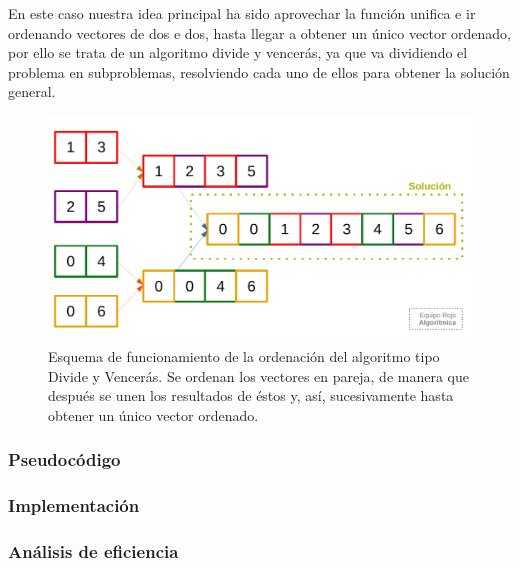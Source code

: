 En este caso nuestra idea principal ha sido aprovechar la función unifica e ir ordenando vectores de dos e dos,
hasta llegar a obtener un único vector ordenado, por ello se trata de un algoritmo divide y vencerás, ya que va dividiendo 
el problema en subproblemas, resolviendo cada uno de ellos para obtener la solución general. 

\begin{figure}[H]
	\centering
    \includegraphics[scale=0.645]{img/orden_2b.pdf}
	\caption{Esquema de funcionamiento de la ordenación del algoritmo tipo Divide y Vencerás. Se ordenan
	los vectores en pareja, de manera que después se unen los resultados de éstos y, así, sucesivamente
	hasta obtener un único vector ordenado.}
	\label{fig:2b-esquema}
\end{figure}

\subsubsection{Pseudocódigo}



\subsubsection{Implementación}



\subsubsection{Análisis de eficiencia}

